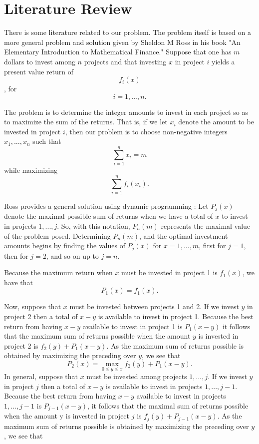 \documentclass{article}
\begin{document}
\section{Literature Review}
\par
There is some literature related to our problem.  The problem itself is based on a more general problem and solution given by Sheldon M Ross \cite{Ross} in his book "An Elementary Introduction to Mathematical Finance."
Suppose that one has $m$ dollars to invest among $n$ projects and that investing $x$ in project $i$ yields a present value return of $$f_{i}(x)$$, for $$i = 1, ..., n.$$ \par The problem is to determine the integer amounts to invest in each project so as to maximize the sum of the returns.  That is, if we let $x_{i}$ denote the amount to be invested in project $i$, then our problem is to choose non-negative integers $x_{1}, ..., x_{n}$ such that $$\sum_{i=1}^{n}x_{i} = m$$ while maximizing $$\sum_{i=1}^{n} f_{i}(x_{i}).$$
\newline
\par
Ross provides a general solution using dynamic programming \cite{Ross}:
\linebreak
Let $P_{j}(x)$ denote the maximal possible sum of returns when we have a total of $x$ to invest in projects $1, ..., j$. So, with this notation, $P_{n}(m)$ represents the maximal value of the problem posed. Determining $P_{n}(m)$, and the optimal investment amounts begins by finding the values of $P_{j}(x)$ for $x = 1, ..., m$, first for $j = 1$, then for $j=2$, and so on up to $j=n$.
\linebreak
\par
Because the maximum return when $x$ must be invested in project 1 is $f_{1}(x)$, we have that 
\newline
$$P_{1}(x) = f_{1}(x).$$
\newline
\par
Now, suppose that $x$ must be invested between projects 1 and 2. If we invest $y$ in project 2 then a total of $x-y$ is available to invest in project 1. Because the best return from having $x-y$ available to invest in project 1 is $P_{1}(x-y)$ it follows that the maximum sum of returns possible when the amount $y$ is invested in project 2 is $f_{2}(y) + P_{1}(x-y).$ As the maximum sum of returns possible is obtained by maximizing the preceding over $y$, we see that $$P_{2}(x) = \max_{0\leq y\leq x} f_{2}(y) + P_{1}(x-y).$$
In general, suppose that $x$ must be invested among projects $1, ..., j$. If we invest $y$ in project $j$ then a total of $x-y$ is available to invest in projects $1, ..., j-1$. Because the best return from having $x-y$ available to invest in projects $1, ..., j-1$ is $P_{j-1}(x-y)$, it follows that the maximal sum of returns possible when the amount y is invested in project $j$ is $f_{j}(y) + P_{j-1}(x-y).$ As the maximum sum of returns possible is obtained by maximizing the preceding over $y$, we see that 
\end{document}
